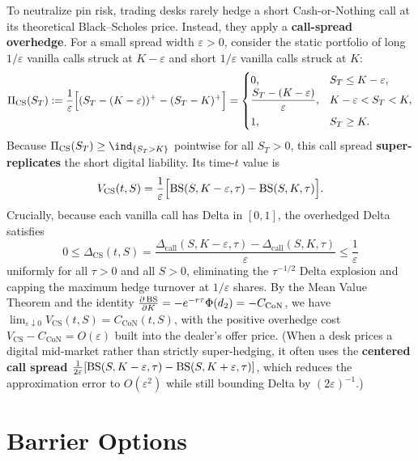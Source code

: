 To neutralize pin risk, trading desks rarely hedge a short Cash-or-Nothing call at its theoretical Black--Scholes price. Instead, they apply a \textbf{call-spread overhedge}. For a small spread width $\varepsilon > 0$, consider the static portfolio of long $1/\varepsilon$ vanilla calls struck at $K - \varepsilon$ and short $1/\varepsilon$ vanilla calls struck at $K$:
\begin{equation}\label{eq:call-spread-overhedge}
    \Pi_{\mathrm{CS}}(S_T) := \frac{1}{\varepsilon}\Bigl[(S_T - (K - \varepsilon))^+ - (S_T - K)^+\Bigr] = \begin{cases}
        0, & S_T \le K - \varepsilon, \\
        \dfrac{S_T - (K - \varepsilon)}{\varepsilon}, & K - \varepsilon < S_T < K, \\[6pt]
        1, & S_T \ge K.
    \end{cases}
\end{equation}
Because $\Pi_{\mathrm{CS}}(S_T) \ge \ind_{\{S_T > K\}}$ pointwise for all $S_T > 0$, this call spread \textbf{super-replicates} the short digital liability. Its time-$t$ value is
\[
V_{\mathrm{CS}}(t, S) = \frac{1}{\varepsilon}\Bigl[\operatorname{BS}(S, K - \varepsilon, \tau) - \operatorname{BS}(S, K, \tau)\Bigr].
\]
Crucially, because each vanilla call has Delta in $[0, 1]$, the overhedged Delta satisfies
\[
0 \le \Delta_{\mathrm{CS}}(t, S) = \frac{\Delta_{\mathrm{call}}(S, K - \varepsilon, \tau) - \Delta_{\mathrm{call}}(S, K, \tau)}{\varepsilon} \le \frac{1}{\varepsilon}
\]
uniformly for all $\tau > 0$ and all $S > 0$, eliminating the $\tau^{-1/2}$ Delta explosion and capping the maximum hedge turnover at $1/\varepsilon$ shares. By the Mean Value Theorem and the identity $\frac{\partial \operatorname{BS}}{\partial K} = -e^{-r\tau}\Phi(d_2) = -C_{\mathrm{CoN}}$, we have $\lim_{\varepsilon \downarrow 0} V_{\mathrm{CS}}(t, S) = C_{\mathrm{CoN}}(t, S)$, with the positive overhedge cost $V_{\mathrm{CS}} - C_{\mathrm{CoN}} = O(\varepsilon)$ built into the dealer's offer price. (When a desk prices a digital mid-market rather than strictly super-hedging, it often uses the \textbf{centered call spread} $\frac{1}{2\varepsilon}[\operatorname{BS}(S, K - \varepsilon, \tau) - \operatorname{BS}(S, K + \varepsilon, \tau)]$, which reduces the approximation error to $O(\varepsilon^2)$ while still bounding Delta by $(2\varepsilon)^{-1}$.)

\section{Barrier Options}

